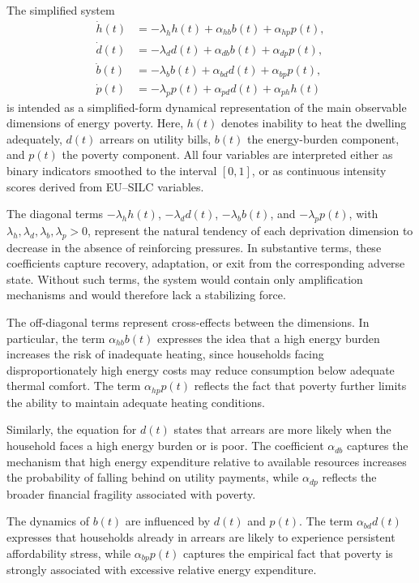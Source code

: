 \documentclass[11pt,a4paper]{article}
\begin{document}
The simplified system
\begin{align}
\dot{h}(t) &= -\lambda_h h(t) + \alpha_{hb} b(t) + \alpha_{hp} p(t), \label{eq:red_h}\\
\dot{d}(t) &= -\lambda_d d(t) + \alpha_{db} b(t) + \alpha_{dp} p(t), \label{eq:red_d}\\
\dot{b}(t) &= -\lambda_b b(t) + \alpha_{bd} d(t) + \alpha_{bp} p(t), \label{eq:red_b}\\
\dot{p}(t) &= -\lambda_p p(t) + \alpha_{pd} d(t) + \alpha_{ph} h(t) \label{eq:red_p}
\end{align}
is intended as a simplified-form dynamical representation of the main observable dimensions of energy poverty. Here,
\(h(t)\) denotes inability to heat the dwelling adequately,
\(d(t)\) arrears on utility bills,
\(b(t)\) the energy-burden component,
and \(p(t)\) the poverty component.
All four variables are interpreted either as binary indicators smoothed to the interval \([0,1]\), or as continuous intensity scores derived from EU--SILC variables.

The diagonal terms \(-\lambda_h h(t)\), \(-\lambda_d d(t)\), \(-\lambda_b b(t)\), and \(-\lambda_p p(t)\), with \(\lambda_h,\lambda_d,\lambda_b,\lambda_p>0\), represent the natural tendency of each deprivation dimension to decrease in the absence of reinforcing pressures. In substantive terms, these coefficients capture recovery, adaptation, or exit from the corresponding adverse state. Without such terms, the system would contain only amplification mechanisms and would therefore lack a stabilizing force.

The off-diagonal terms represent cross-effects between the dimensions. In particular, the term
\(\alpha_{hb} b(t)\) expresses the idea that a high energy burden increases the risk of inadequate heating, since households facing disproportionately high energy costs may reduce consumption below adequate thermal comfort. The term \(\alpha_{hp} p(t)\) reflects the fact that poverty further limits the ability to maintain adequate heating conditions.

Similarly, the equation for \(d(t)\) states that arrears are more likely when the household faces a high energy burden or is poor. The coefficient \(\alpha_{db}\) captures the mechanism that high energy expenditure relative to available resources increases the probability of falling behind on utility payments, while \(\alpha_{dp}\) reflects the broader financial fragility associated with poverty.

The dynamics of \(b(t)\) are influenced by \(d(t)\) and \(p(t)\). The term \(\alpha_{bd} d(t)\) expresses that households already in arrears are likely to experience persistent affordability stress, while \(\alpha_{bp} p(t)\) captures the empirical fact that poverty is strongly associated with excessive relative energy expenditure.
\end{document}
